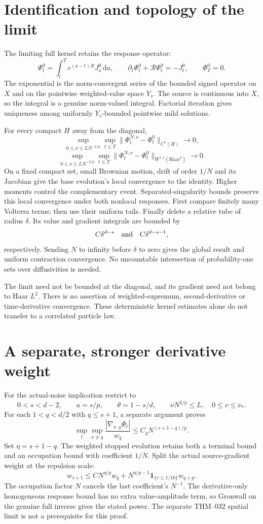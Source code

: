 \documentclass[10pt]{article}
\newcommand{\dd}{\,\mathrm d}
\newcommand{\R}{\mathcal R}
\begin{document}
\newpage
\section*{Identification and topology of the limit}
The limiting full kernel retains the response operator:
\[
 \Phi_t^0=\int_t^T e^{(a-t)\R}J_a^0\dd a,\qquad
 \partial_t\Phi_t^0+\R\Phi_t^0=-J_t^0,\qquad\Phi_T^0=0.
\]
The exponential is the norm-convergent series of the bounded signed
operator on $X$ and on the pointwise weighted-value space $Y_s$.
The source is continuous into $X$, so the integral is a genuine
norm-valued integral. Factorial iteration gives uniqueness among uniformly
$Y_s$-bounded pointwise mild solutions.

For every compact $H$ away from the diagonal,
\[
 \sup_{0\le\nu\le L N^{-2/p}}\sup_{t\le T}
 \|\Phi_t^{N,\nu}-\Phi_t^0\|_{C^1(H)}\longrightarrow0,
\]
\[
 \sup_{0\le\nu\le L N^{-2/p}}\sup_{t\le T}
 \|\Phi_t^{N,\nu}-\Phi_t^0\|_{W^{1,1}(\mathrm{Haar}^2)}
 \longrightarrow0.
\]
On a fixed compact set, small Brownian motion, drift of order $1/N$ and
its Jacobian give the base evolution's local convergence to the identity.
Higher moments control the complementary event. Separated-singularity
bounds preserve this local convergence under both nonlocal responses.
First compare finitely many Volterra terms; then use their uniform tails.
Finally delete a relative tube of radius $\delta$. Its value and gradient
integrals are bounded by
\[
 C\delta^{d-s}\quad\hbox{and}\quad C\delta^{d-s-1},
\]
respectively. Sending $N$ to infinity before $\delta$ to zero gives the
global result and uniform contraction convergence. No uncountable
intersection of probability-one sets over diffusivities is needed.

The limit need not be bounded at the diagonal, and its gradient need not
belong to Haar $L^2$. There is no assertion of weighted-supremum,
second-derivative or time-derivative convergence. These deterministic
kernel estimates alone do not transfer to a correlated particle law.

\section*{A separate, stronger derivative weight}
For the actual-noise implication restrict to
\[
 0<s<d-2,\qquad a=s/p,\qquad\theta=1-s/d,
 \qquad \nu N^{2/p}\le L,\quad 0\le\nu\le\nu_*.
\]
For each $1<q<d/2$ with $q\le s+1$, a separate argument proves
\[
 \sup_t\sup_{x\ne y}\frac{|\nabla_{x,y}\Phi_t|}{w_q}
 \le C_q N^{(s+1-q)/p}.
\]
Set $\eta=s+1-q$. The weighted stopped evolution retains both a terminal
bound and an occupation bound with coefficient $1/N$. Split the actual
source-gradient weight at the repulsion scale:
\[
 w_{s+1}\le C N^{\eta/p}w_q
       +N^{\eta/p-1}\mathbf1_{\{r\le1/16\}}w_{q+p}.
\]
The occupation factor $N$ cancels the last coefficient's $N^{-1}$.
The derivative-only homogeneous response bound has no extra value-amplitude
term, so Gronwall on the genuine full inverse gives the stated power.
The separate THM--032 spatial limit is not a prerequisite for this proof.
\end{document}
